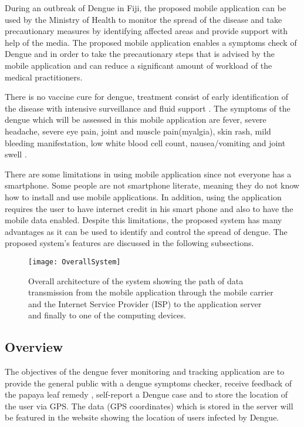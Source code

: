 \documentclass[runningheads,a4paper]{llncs}
\begin{document}
During an outbreak of Dengue in Fiji, the proposed mobile application can be used by the Ministry of Health  to monitor the spread of the disease and take precautionary measures by identifying affected areas and provide support with help of the media. The proposed mobile application enables a symptoms check of Dengue and in order to take the precautionary steps that is advised by the mobile application and can reduce a significant amount of workload of the medical practitioners. 

There is no vaccine cure for dengue, treatment consist of early identification of the disease with intensive surveillance and fluid support \cite{Matthews:2012}. 
The symptoms of the dengue which will be assessed in this mobile application are fever, severe headache, severe eye pain, joint and muscle pain(myalgia), skin rash, mild bleeding manifestation, low white blood cell count, nausea/vomiting and joint swell \cite{Humayoun2010e54} \cite{WHO2009}.



There are some limitations in using mobile application since not everyone has a smartphone. Some people are not smartphone literate, meaning they do not know how to install and use  mobile applications. In addition, using the application requires the user to have internet credit in his smart phone and also to have the mobile data enabled. Despite this limitations, the proposed system has many advantages as it can be used to identify and control the spread of dengue. The proposed system's features are discussed in the following subsections. 

\begin{figure}
    \begin{center}
    \texttt{[image: OverallSystem]}
    \caption{Overall architecture of the system showing the path of data transmission from the mobile application through the mobile carrier and the Internet Service Provider (ISP) to the application server and finally to one of the computing devices.}
  \end{center}
\end{figure}

\subsection{Overview}
The objectives of the dengue fever monitoring and tracking application are to provide the general public with a dengue symptoms checker, receive feedback of the papaya leaf remedy \cite{Ahmad2011330}, self-report a Dengue case and to store the location of the user via GPS. The data (GPS coordinates) which is stored in the server will be featured in the website showing the location of users infected by Dengue.
\end{document}
